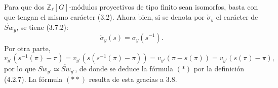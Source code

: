 \begin{prooftext}[Demostración]
Para que dos $\mathbb Z_\ell[G]$-módulos proyectivos de tipo finito sean isomorfos, basta con que tengan el mismo carácter (3.2). Ahora bien, si se denota por $\check\sigma_y$ el carácter de $\check{Sw}_y$, se tiene (3.7.2):
\[
\check\sigma_y(s)=\sigma_y(s^{-1}).
\]
Por otra parte,
\[
v_{y'}(s^{-1}(\pi)-\pi)
=v_{y'}(s(s^{-1}(\pi)-\pi))
=v_{y'}(\pi-s(\pi))
=v_{y'}(s(\pi)-\pi),
\]
por lo que $Sw_{y'}\simeq\check{Sw}_{y'}$, de donde se deduce la fórmula $(*)$ por la definición (4.2.7). La fórmula $(**)$ resulta de esta gracias a 3.8.
\end{prooftext}
